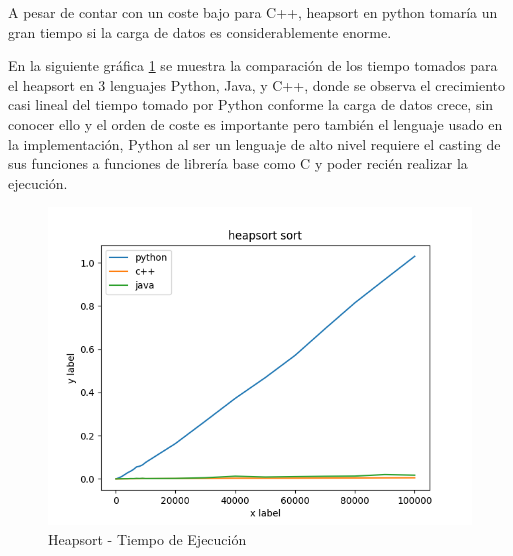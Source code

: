 \documentclass{article}
\begin{document}
\begin{enumerate}
                            
                            
                            A pesar de contar con un coste bajo para C++, heapsort en python tomaría un gran tiempo si la carga de datos es considerablemente enorme.
                            
                            
                            
                            En la siguiente gráfica \ref{fig:heapsort_diagram} se muestra la comparación de los tiempo tomados para el heapsort en 3 lenguajes Python, Java, y C++, donde se observa el crecimiento casi lineal del tiempo tomado por Python conforme la carga de datos crece, sin conocer ello y el orden de coste es importante pero también el lenguaje usado en la implementaci\'{o}n, Python al ser un lenguaje de alto nivel requiere el casting de sus funciones a funciones de librería base como C y poder recién realizar la ejecución.
                            
                            \begin{figure}[H]
                                \centering
                                \includegraphics[scale=0.6]{img/heapsort_diagram.png}
                                \caption{Heapsort - Tiempo de Ejecución}
                                \label{fig:heapsort_diagram}
                            \end{figure}
		                

\end{enumerate}
\end{document}
